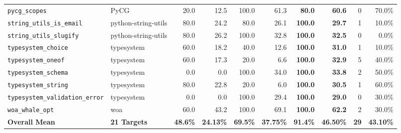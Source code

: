 \documentclass[conference]{IEEEtran}
\begin{document}
\begin{table}[t]
\begin{tabular}{ll|rr|rr|rrr|r}
\texttt{pycg\_scopes} & PyCG & 20.0 & 12.5 & 100.0 & 61.3 & \textbf{80.0} & \textbf{60.6} & 0 & 70.0\% \\
\texttt{string\_utils\_is\_email} & python-string-utils & 80.0 & 24.2 & 80.0 & 26.1 & \textbf{100.0} & \textbf{29.7} & 1 & 10.0\% \\
\texttt{string\_utils\_slugify} & python-string-utils & 80.0 & 26.2 & 100.0 & 32.8 & \textbf{100.0} & \textbf{32.5} & 0 & 0.0\% \\
\texttt{typesystem\_choice} & typesystem & 60.0 & 18.2 & 40.0 & 12.6 & \textbf{100.0} & \textbf{31.0} & 1 & 10.0\% \\
\texttt{typesystem\_oneof} & typesystem & 60.0 & 17.3 & 20.0 & 6.6 & \textbf{100.0} & \textbf{32.9} & 5 & 40.0\% \\
\texttt{typesystem\_schema} & typesystem & 0.0 & 0.0 & 100.0 & 34.0 & \textbf{100.0} & \textbf{33.8} & 2 & 50.0\% \\
\texttt{typesystem\_string} & typesystem & 80.0 & 22.8 & 20.0 & 6.0 & \textbf{100.0} & \textbf{30.5} & 1 & 60.0\% \\
\texttt{typesystem\_validation\_error} & typesystem & 0.0 & 0.0 & 100.0 & 29.4 & \textbf{100.0} & \textbf{29.0} & 0 & 30.0\% \\
\texttt{woa\_whale\_opt} & woa & 60.0 & 43.2 & 100.0 & 69.1 & \textbf{100.0} & \textbf{62.2} & 2 & 30.0\% \\
\midrule
\textbf{Overall Mean} & \textbf{21 Targets} & \textbf{48.6\%} & \textbf{24.13\%} & \textbf{69.5\%} & \textbf{37.75\%} & \textbf{91.4\%} & \textbf{46.50\%} & \textbf{29} & \textbf{43.10\%} \\
\bottomrule
\end{tabular}
\end{table}
\end{document}
